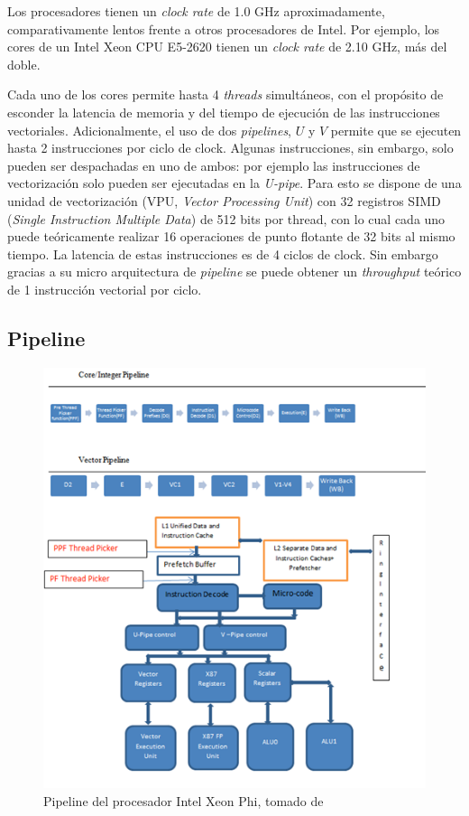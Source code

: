 Los procesadores tienen un \textit{clock rate} de 1.0 GHz aproximadamente, comparativamente lentos frente
a otros procesadores de Intel. Por ejemplo, los cores de un Intel Xeon CPU E5-2620 tienen un \textit{clock rate}
de 2.10 GHz, m\'as del doble.

Cada uno de los cores permite hasta 4 \textit{threads} simult\'aneos, con el prop\'osito de esconder la latencia de memoria y del tiempo de ejecuci\'on de
las instrucciones vectoriales. Adicionalmente, el uso de dos \textit{pipelines}, $U$ y $V$ permite que se ejecuten hasta 2
instrucciones por ciclo de clock.  Algunas instrucciones, sin embargo, solo pueden ser despachadas en uno de ambos:
por ejemplo las instrucciones de vectorizaci\'on solo pueden ser ejecutadas en la \textit{U-pipe}. Para esto se dispone
de una unidad de vectorizaci\'on (VPU, \textit{Vector Processing Unit}) con 32 registros SIMD (\textit{Single Instruction
Multiple Data}) de 512 bits por thread, con lo cual cada uno puede te\'oricamente realizar 16 operaciones de punto flotante de
32 bits al mismo tiempo. La latencia de estas instrucciones es de 4 ciclos de clock. Sin embargo gracias a su micro
arquitectura de \textit{pipeline} se puede obtener un \textit{throughput} te\'orico de 1 instrucci\'on vectorial por ciclo.

\subsection{Pipeline}

\begin{figure}[htbp]
   \centering
   \includegraphics[width=\plotwidth]{images/xeon-phi-pipeline.png}
   \caption{Pipeline del procesador Intel Xeon Phi, tomado de~\cite{BookXeonPhi} }
   \label{fig::xeon_phi_pipeline}
\end{figure}


